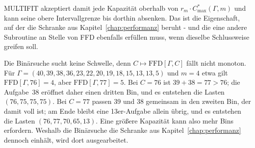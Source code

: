 MULTIFIT akzeptiert damit jede Kapazität oberhalb von $r_m \cdot C^{*}_{\max}(\Gamma, m)$ und kann
seine obere Intervallgrenze bis dorthin absenken.
Das ist die Eigenschaft, auf der die Schranke aus Kapitel~\ref{chap:performanz} beruht - und
die eine andere Subroutine an Stelle von FFD ebenfalls erfüllen muss, wenn dieselbe Schlussweise
greifen soll.

\begin{bemerkung}
\label{bem:nicht-monoton}
Die Binärsuche sucht keine Schwelle, denn $C \mapsto \mathrm{FFD}[\Gamma, C]$ fällt nicht monoton.
Für $\Gamma = (40, 39, 38, 36, 23, 22, 20, 19, 18, 15, 13, 13, 5)$ und $m = 4$ etwa gilt
$\mathrm{FFD}[\Gamma, 76] = 4$, aber $\mathrm{FFD}[\Gamma, 77] = 5$.
Bei $C = 76$ ist $39 + 38 = 77 > 76$; die Aufgabe~38 eröffnet daher einen dritten Bin, und es
entstehen die Lasten $(76, 75, 75, 75)$.
Bei $C = 77$ passen 39 und 38 gemeinsam in den zweiten Bin, der damit voll ist; am Ende bleibt eine
13er-Aufgabe allein übrig, und es entstehen die Lasten $(76, 77, 70, 65, 13)$.
Eine größere Kapazität kann also mehr Bins erfordern.
Weshalb die Binärsuche die Schranke aus Kapitel~\ref{chap:performanz} dennoch einhält, wird
dort ausgearbeitet.
\end{bemerkung}
